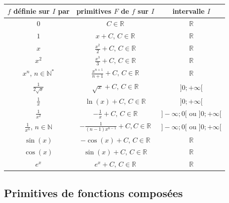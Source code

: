 \documentclass[french]{book}
\begin{document}
\begin{exemple}
\begin{center}
 \begin{tabular}{|c|c|c|}
  \hline
$f$ définie sur $I$ par & primitives $F$ de $f$ sur $I$  & intervalle $I$ \\
\hline
$0$ & $C\in \mathbb{R}$ & $\mathbb{R}$\\
\hline
$1$ & $x+C,\, C\in\mathbb{R}$ & $\mathbb{R}$\\
\hline
$x$ & $\frac{x^2}{2}+C,\, C\in\mathbb{R}$ & $\mathbb{R}$ \\
\hline
$x^2$ & $\frac{x^3}{3}+C,\, C\in\mathbb{R}$ & $\mathbb{R}$ \\
\hline
$x^n$, $n\in\mathbb{N^{*}}$ & $\frac{x^{n+1}}{n+1}+C,\, C\in\mathbb{R}$ & $\mathbb{R}$\\
\hline
$\frac{1}{2\sqrt{x}}$ & $\sqrt{x}+C,\, C\in\mathbb{R}$ & $]0;+\infty[$ \\
\hline
$\frac{1}{x}$ & $\ln (x)+C,\, C\in\mathbb{R}$& $]0;+\infty[$ \\
\hline
$\frac{1}{x^2}$ & $-\frac{1}{x}+C,\, C\in\mathbb{R}$ & $]-\infty;0[$ ou $]0;+\infty[$\\
\hline
$\frac{1}{x^n}$, $n\in\mathbb{N}$ & $-\frac{1}{(n-1)x^{n-1}}+C, C\in\mathbb{R}$ & $]-\infty;0[$ ou $]0;+\infty[$ \\
\hline
$\sin (x)$  & $-\cos (x)+C,\, C\in\mathbb{R}$ & $\mathbb{R}$ \\
\hline
$\cos (x)$ & $\sin (x)+C,\, C\in\mathbb{R}$ & $\mathbb{R}$ \\ 
\hline
$e^{x}$ &  $e^{x}+C,\, C\in\mathbb{R}$ & $\mathbb{R}$ \\
\hline
\end{tabular}
\end{center}
\end{exemple}


\subsection{Primitives de fonctions composées}
\end{document}

